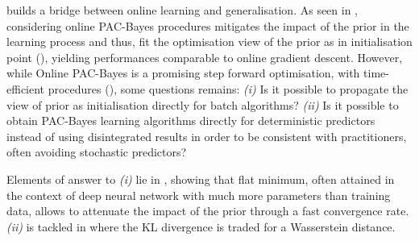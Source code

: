   builds a bridge between online learning and generalisation. As seen in , considering online PAC-Bayes procedures mitigates the impact of the prior in the learning process and thus, fit the optimisation view of the prior as in initialisation point (), yielding performances comparable to online gradient descent. 
However, while Online PAC-Bayes is a promising step forward optimisation, with time-efficient procedures (), some questions remains: \textit{(i)} Is it possible to propagate the view of prior as initialisation directly for batch algorithms? \textit{(ii)} Is it possible to obtain PAC-Bayes learning algorithms directly for deterministic predictors instead of using disintegrated results in order to be consistent with practitioners, often avoiding stochastic predictors?

 Elements of answer to \textit{(i)} lie in , showing that flat minimum, often attained in the context of deep neural network with much more parameters than training data, allows to attenuate the impact of the prior through a fast convergence rate. \textit{(ii)} is tackled in  where the KL divergence is traded for a Wasserstein distance. 


